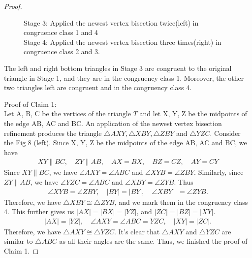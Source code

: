 \begin{proof}
\begin{figure}[h!]
\begin{tikzpicture}[scale=0.8]
      \end{tikzpicture}
    \caption{Stage 3: Applied the newest vertex bisection twice(left) in congruence class 1 and 4\\Stage 4: Applied the newest vertex bisection three times(right) in congruence class 2 and 3.}
    \label{fig6: sub2}
    \end{figure}

    \begin{claim}
    The left and right bottom triangles in Stage 3 are congruent to the original triangle in Stage 1, and they are in the congruency class 1. Moreover, the other two triangles left are congruent and in the congruency class 4.
    \end{claim}
    \noindent
    Proof of Claim 1: \\
    Let A, B, C be the vertices of the triangle $T$ and let X, Y, Z be the midpoints of the edge AB, AC and BC. An application of the newest vertex bisection refinement produces the triangle $\triangle{AXY}, \triangle{XBY}, \triangle{ZBY}$ and $\triangle{YZC}$. Consider the Fig 8 (left).
    Since X, Y, Z be the midpoints of the edge AB, AC and BC, we have 
    \begin{align*}
     XY \parallel BC,
     \quad 
     ZY \parallel AB,
     \quad 
     AX = BX, 
     \quad 
     BZ = CZ, 
     \quad
     AY = CY
    \end{align*}
    Since $XY\parallel BC$, we have $\angle{AXY} = \angle{ABC}$ and $\angle{XYB} = \angle{ZBY}$. Similarly, since $ZY\parallel AB$, we have $\angle{YZC} = \angle{ABC}$ and $\angle{XBY} = \angle{ZYB}$. Thus 
    \begin{align*}
    \angle{XYB} = \angle{ZBY},
    \quad
    |BY| = |BY|,
    \quad
    \angle{XBY} &= \angle{ZYB}.
    \end{align*}
    Therefore, we have $\triangle{XBY} \cong \triangle{ZYB}$, and we mark them in the congruency class 4. This further gives us $|AX| = |BX| = |YZ|$, and $|ZC| = |BZ| = |XY|$.
    \begin{align*}
    |AX| = |YZ|,
    \quad
    \angle{AXY} = \angle{ABC} = {YZC},
    \quad
    |XY| = |ZC|.
    \end{align*}
    Therefore, we have $\triangle{AXY} \cong \triangle{YZC}$. It's clear that $\triangle{AXY}$ and $\triangle{YZC}$ are similar to $\triangle{ABC}$ as all their angles are the same. Thus, we finished the proof of Claim 1.


\end{proof}
